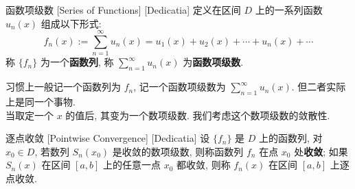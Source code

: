




        \begin{dfn}
            {函数项级数}
            [Series of Functions]
            [Dedicatia]
            定义在区间 \(D\) 上的一系列函数 \(u_n(x)\) 组成以下形式: \[f_n(x):=\sum_{n = 1}^{\infty} u_n(x)=u_1(x)+u_2(x)+\cdots+u_n(x)+\cdots \]
            称 \(\{f_n\}\) 为一个\textbf{函数列}, 称 \(\displaystyle\sum_{n=1}^{\infty}u_n(x)\) 为\textbf{函数项级数}. 
        \end{dfn}

        习惯上一般记一个函数列为 \(f_n\), 记一个函数项级数为 \(\sum_{n = 1}^{\infty} u_n(x) \). 但二者实际上是同一个事物. \\
        当取定一个 \(x\) 的值后, 其变为一个数项级数. 我们考虑这个数项级数的敛散性. 
        
        \begin{dfn}
            {逐点收敛}
            [Pointwise Convergence]
            [Dedicatia]
            设 \(\{f_n\}\) 是 \(D\) 上的函数列, 对 \(x_0\in D\), 若数列 \(S_n(x_0)\) 是收敛的数项级数, 则称函数列 \(f_n\) 在点 \(x_0\) 处\textbf{收敛}; 如果 \(S_n(x)\) 在区间 \([a,b]\) 上的任意一点 \(x_0\) 都收敛, 则称 \(f_n(x)\) 在区间 \([a,b]\) 上逐点收敛. 
        \end{dfn}

